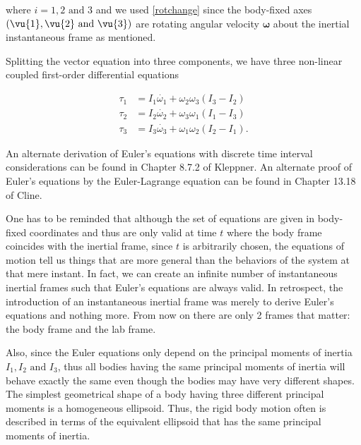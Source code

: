 \documentclass[a4paper,12pt]{report}
\begin{document}
where \(i = 1,2 \text{ and } 3\) and we used \cref{rotchange} since the body-fixed axes \((\vu{1} ,\vu{2} \text{ and } \vu{3} )\) are rotating angular velocity \(\boldsymbol{\omega } \) about the inertial instantaneous frame as mentioned.

Splitting the vector equation into three components, we have three non-linear coupled first-order differential equations 

\begin{equation}
	\begin{aligned}
		\tau _{1} &= I_1 \dot{\omega _{1} } + \omega _{2} \omega _{3} (I_3-I_2) \\
		\tau _{2} &= I_2 \dot{\omega _{2} } + \omega _{3} \omega _{1} (I_1-I_3) \\
		\tau _{3}  &= I_3 \dot{\omega _{3} } + \omega _{1} \omega _{2} (I_2 -I_1).
	\end{aligned}
\end{equation}

An alternate derivation of Euler's equations with discrete time interval considerations can be found in Chapter 8.7.2 of Kleppner. An alternate proof of Euler's equations by the Euler-Lagrange equation can be found in Chapter 13.18 of Cline.

One has to be reminded that although the set of equations are given in body-fixed coordinates and thus are only valid at time \(t\) where the body frame coincides with the inertial frame, since \(t\) is arbitrarily chosen, the equations of motion tell us things that are more general than the behaviors of the system at that mere instant. In fact, we can create an infinite number of instantaneous inertial frames such that Euler's equations are always valid. In retrospect, the introduction of an instantaneous inertial frame was merely to derive Euler's equations and nothing more. From now on there are only 2 frames that matter: the body frame and the lab frame.

Also, since the Euler equations only depend on the principal moments of inertia \(I_1, I_2 \text{ and } I_3\), thus all bodies having the same principal moments of inertia will behave exactly the same even though the bodies may have very different shapes. The simplest geometrical shape of a body having three different principal moments is a homogeneous ellipsoid. Thus, the rigid body motion often is described in terms of the equivalent ellipsoid that has the same principal moments of inertia. 
\end{document}
